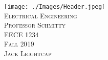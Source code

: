 \documentclass{article}
\newcommand\course{EECE 1234}
\newcommand\coursetitle{Electrical Engineering}
\newcommand\prof{Schmitty}
\newcommand\semester{Fall 2019}
\newcommand\name{Jack Leightcap}
\begin{document}
\begin{titlepage}
    \centering
    \texttt{[image: ./Images/Header.jpeg]}\\
    \vspace*{\fill}
    \textsc{\LARGE{\coursetitle}}\\[0.3cm]
    \textsc{\Large{Professor \prof}}\\[0.3cm]
    \textsc{\large{\course}}\\[0.3cm]
    \textsc{\large{\semester}}\\
    \vspace*{\fill}
    \textsc{\name}
\end{titlepage}
\thispagestyle{empty} 
\tableofcontents
\pagebreak
\setcounter{page}{1}
\pagestyle{fancy}
\end{document}
